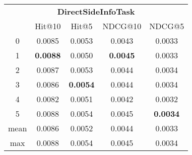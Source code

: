 \documentclass{article}
\begin{document}
 

\begin{tabular}{c|cccc}

\multicolumn{5}{c}{\textbf{DirectSideInfoTask}} \\
\noalign{\smallskip}
\noalign{\smallskip}
\toprule
\multicolumn{1}{c}{Template ID} & \multicolumn{1}{|c}{Hit@10} & \multicolumn{1}{c}{Hit@5} & \multicolumn{1}{c}{NDCG@10} & \multicolumn{1}{c}{NDCG@5} \\
\midrule
0 & 0.0085 & 0.0053 & 0.0043 & 0.0033 \\
1 & \textbf{0.0088} & 0.0050 & \textbf{0.0045} & 0.0033 \\
2 & 0.0087 & 0.0053 & 0.0044 & 0.0034 \\
3 & 0.0086 & \textbf{0.0054} & 0.0044 & 0.0034 \\
4 & 0.0082 & 0.0051 & 0.0042 & 0.0032 \\
5 & 0.0088 & 0.0054 & 0.0045 & \textbf{0.0034} \\
\midrule
mean & 0.0086 & 0.0052 & 0.0044 & 0.0033 \\
max & 0.0088 & 0.0054 & 0.0045 & 0.0034 \\
\bottomrule

\end{tabular}
\end{document}

